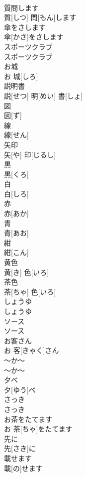 \documentclass[8pt]{extreport}
\begin{document}
\begin{CJK}{UTF8}{min}
\\	質問します	
\\	質[しつ] 問[もん]します		
\\	傘をさします	
\\	傘[かさ]をさします		
\\	スポーツクラブ	
\\	スポーツクラブ		
\\	お城	
\\	お 城[しろ]		
\\	説明書	
\\	説[せつ] 明[めい] 書[しょ]		
\\	図	
\\	図[ず]		
\\	線	
\\	線[せん]		
\\	矢印	
\\	矢[や] 印[じるし]		
\\	黒	
\\	黒[くろ]		
\\	白	
\\	白[しろ]		
\\	赤	
\\	赤[あか]		
\\	青	
\\	青[あお]		
\\	紺	
\\	紺[こん]		
\\	黄色	
\\	黄[き] 色[いろ]		
\\	茶色	
\\	茶[ちゃ] 色[いろ]		
\\	しょうゆ	
\\	しょうゆ		
\\	ソース	
\\	ソース		
\\	お客さん	
\\	お 客[きゃく]さん		
\\	～か～	
\\	～か～		
\\	夕べ	
\\	夕[ゆう]べ		
\\	さっき	
\\	さっき		
\\	お茶をたてます	
\\	お 茶[ちゃ]をたてます		
\\	先に	
\\	先[さき]に		
\\	載せます	
\\	載[の]せます		

\end{CJK}
\end{document}
